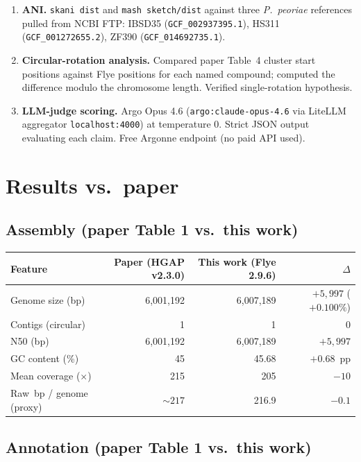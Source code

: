 \documentclass[11pt,a4paper]{article}
\begin{document}
\begin{enumerate}
\begin{itemize}
      \end{itemize}
      Both runs found 19 protoclusters. Run~2 identified 6 of them as the paper's named
      compounds.
\item \textbf{ANI.} \texttt{skani dist} and \texttt{mash sketch/dist} against three
      \textit{P.\ peoriae} references pulled from NCBI FTP:
      IBSD35 (\texttt{GCF\_002937395.1}),
      HS311  (\texttt{GCF\_001272655.2}),
      ZF390  (\texttt{GCF\_014692735.1}).
\item \textbf{Circular-rotation analysis.} Compared paper Table~4 cluster start positions
      against Flye positions for each named compound; computed the difference modulo the
      chromosome length. Verified single-rotation hypothesis.
\item \textbf{LLM-judge scoring.} Argo Opus 4.6 (\texttt{argo:claude-opus-4.6} via LiteLLM
      aggregator \texttt{localhost:4000}) at temperature 0. Strict JSON output evaluating
      each claim. Free Argonne endpoint (no paid API used).
\end{enumerate}

\section{Results vs.\ paper}

\subsection{Assembly (paper Table 1 vs.\ this work)}

\begin{tabular}{@{}l r r r@{}}
\toprule
Feature & Paper (HGAP v2.3.0) & This work (Flye 2.9.6) & $\Delta$ \\
\midrule
Genome size (bp)      & 6{,}001{,}192 & 6{,}007{,}189 & ${+}5{,}997$ (${+}0.100\%$) \\
Contigs (circular)    & 1             & 1             & 0 \\
N50 (bp)              & 6{,}001{,}192 & 6{,}007{,}189 & ${+}5{,}997$ \\
GC content (\%)       & 45            & 45.68         & ${+}0.68$~pp \\
Mean coverage (${\times}$) & 215      & 205           & ${-}10$ \\
Raw~bp / genome (proxy) & ${\sim}217$ & 216.9         & ${-}0.1$ \\
\bottomrule
\end{tabular}

\subsection{Annotation (paper Table 1 vs.\ this work)}
\end{document}

